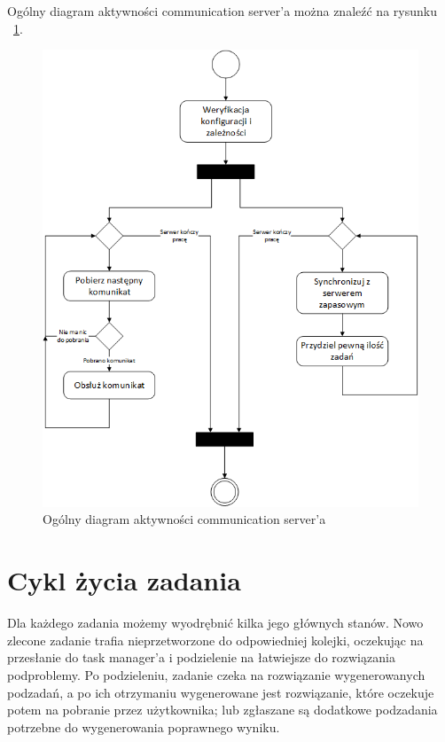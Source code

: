 \documentclass{report}
\begin{document}
	Ogólny diagram aktywności communication server'a można znaleźć na rysunku 
	~\ref{CommunicationServerGeneralActivity}.
	
	\begin{figure}
		\centering
		\includegraphics[width=\textwidth]{img/CommunicationServer-General.png}
		\caption{Ogólny diagram aktywności communication server'a}
		\label{CommunicationServerGeneralActivity}
	\end{figure}
	
\section{Cykl życia zadania}

	Dla każdego zadania możemy wyodrębnić kilka jego głównych stanów. Nowo zlecone zadanie
	trafia nieprzetworzone do odpowiedniej kolejki, oczekując na przesłanie do task manager'a
	i podzielenie na łatwiejsze do rozwiązania podproblemy. Po podzieleniu, zadanie czeka na rozwiązanie
	wygenerowanych podzadań, a po ich otrzymaniu wygenerowane jest rozwiązanie, które oczekuje potem na
	pobranie przez użytkownika; lub zgłaszane są dodatkowe podzadania potrzebne do wygenerowania poprawnego
	wyniku.
	
\end{document}
